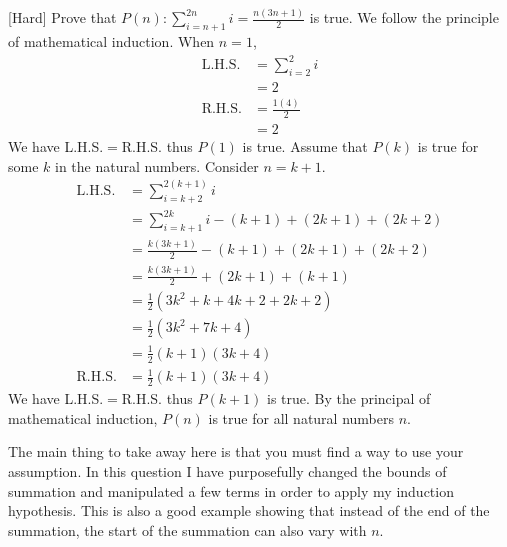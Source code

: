 \documentclass[a4paper]{article}
\begin{document}
\begin{eg}{}{}[Hard] Prove that $P(n):\sum_{i=n+1}^{2n}i=\frac{n(3n+1)}{2}$ is true. 
We follow the principle of mathematical induction. When $n=1$, 
\begin{align*}
\text{L.H.S.}&=\sum_{i=2}^2i\\
&=2\\
\text{R.H.S.}&=\frac{1(4)}{2}\\
&=2
\end{align*} We have L.H.S.$=$R.H.S. thus $P(1)$ is true. \linebreak\linebreak
Assume that $P(k)$ is true for some $k$ in the natural numbers. Consider $n=k+1$. 
\begin{align*}
\text{L.H.S.}&=\sum_{i=k+2}^{2(k+1)}i\\
&=\sum_{i=k+1}^{2k}i-(k+1)+(2k+1)+(2k+2)\tag{Check that this is true!}\\
&=\frac{k(3k+1)}{2}-(k+1)+(2k+1)+(2k+2)\tag{By assumption}\\
&=\frac{k(3k+1)}{2}+(2k+1)+(k+1)\\
&=\frac{1}{2}(3k^2+k+4k+2+2k+2)\\
&=\frac{1}{2}(3k^2+7k+4)\\
&=\frac{1}{2}(k+1)(3k+4)\\
\text{R.H.S.}&=\frac{1}{2}(k+1)(3k+4)
\end{align*} We have L.H.S.$=$R.H.S. thus $P(k+1)$ is true. By the principal of mathematical induction, $P(n)$ is true for all natural numbers $n$. 
\end{eg}
The main thing to take away here is that you must find a way to use your assumption. In this question I have purposefully changed the bounds of summation and manipulated a few terms in order to apply my induction hypothesis. This is also a good example showing that instead of the end of the summation, the start of the summation can also vary with $n$. 
\end{document}
